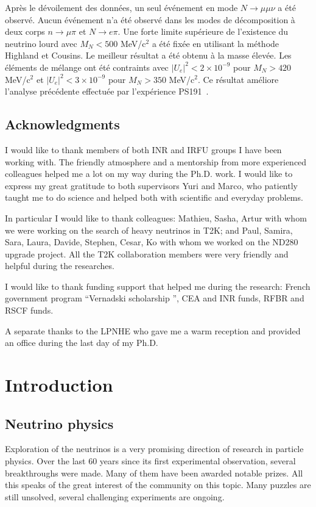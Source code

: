 \documentclass[../main.tex]{subfiles}
\begin{document}
Après le dévoilement des données, un seul événement en mode $N\to\mu\mu\nu$ a été observé. Aucun événement n'a été observé dans les modes de décomposition à deux corps $n\to\mu\pi$ et $N\to e\pi$. Une forte limite supérieure de l'existence du neutrino lourd avec $M_N < 500$ MeV/c${}^2$ a été fixée en utilisant la méthode Highland et Cousins. Le meilleur résultat a été obtenu à la masse élevée. Les éléments de mélange ont été contraints avec $\left|U_e\right|^2 < 2\times10^{-9}$ pour $M_N > 420$ MeV/c${}^2$ et $\left|U_e\right|^2 < 3\times10^{-9}$ pour $M_N > 350$ MeV/c${}^2$. Ce résultat améliore l'analyse précédente effectuée par l'expérience PS191~\cite{Abe2019l}.


\chapter*{Acknowledgments}

I would like to thank members of both INR and IRFU groups I have been working with. The friendly atmosphere and a mentorship from more experienced colleagues helped me a lot on my way during the Ph.D. work. I would like to express my great gratitude to both supervisors Yuri and Marco, who patiently taught me to do science and helped both with scientific and everyday problems.

In particular I would like to thank colleagues: Mathieu, Sasha, Artur with whom we were working on the search of heavy neutrinos in T2K; and Paul, Samira, Sara, Laura, Davide, Stephen, Cesar, Ko with whom we worked on the ND280 upgrade project. All the T2K collaboration members were very friendly and helpful during the researches.

I would like to thank funding support that helped me during the research: French government program ``Vernadski scholarship '', CEA and INR funds, RFBR and RSCF funds.

A separate thanks to the LPNHE who gave me a warm reception and provided an office during the last day of my Ph.D.


\part{Introduction}
\label{part:intro:general}

\chapter{Neutrino physics}
\label{ch:nu_phys}
Exploration of the neutrinos is a very promising direction of research in particle physics. Over the last 60 years since its first experimental observation, several breakthroughs were made. Many of them have been awarded notable prizes. All this speaks of the great interest of the community on this topic. Many puzzles are still unsolved, several challenging experiments are ongoing.
\end{document}
